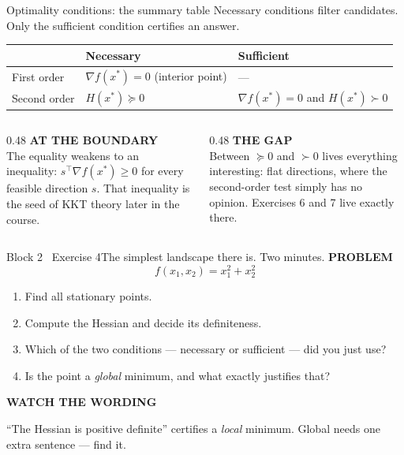 \documentclass[aspectratio=169,11pt]{beamer}
\newcommand{\kicker}[1]{{\color{hseaccent}\scriptsize\bfseries\MakeUppercase{#1}}}
\newcommand{\takeaway}[2]{%
  \par\smallskip\noindent
  \colorbox{hselight}{\parbox{\dimexpr\textwidth-2\fboxsep}{%
    \kicker{#1}\par\vspace{0.12em}\footnotesize #2}}\par}
\begin{document}
\begin{frame}{Optimality conditions: the summary table}
  {Necessary conditions filter candidates. Only the sufficient condition certifies an answer.}
  \vspace{0.5em}
  \centering
  \begin{tabular}{@{}l l l@{}}
    \toprule
                 & \textbf{Necessary}                    & \textbf{Sufficient}                         \\
    \midrule
    First order  & $\nabla f(x^\ast)=0$ (interior point) & ---                                         \\[0.35em]
    Second order & $H(x^\ast)\succeq 0$                  & $\nabla f(x^\ast)=0$ and $H(x^\ast)\succ 0$ \\
    \bottomrule
  \end{tabular}
  \vspace{0.9em}
  \begin{columns}[T,onlytextwidth]
    \begin{column}{0.48\textwidth}
      \kicker{at the boundary}\\[0.25em]
      {\small The equality weakens to an inequality: $s^{\top}\nabla f(x^\ast)\ge 0$ for every feasible
        direction $s$. That inequality is the seed of KKT theory later in the course.}
    \end{column}
    \begin{column}{0.48\textwidth}
      \kicker{the gap}\\[0.25em]
      {\small Between $\succeq 0$ and $\succ 0$ lives everything interesting: flat directions, where the
        second-order test simply has no opinion. Exercises 6 and 7 live exactly there.}
    \end{column}
  \end{columns}
\end{frame}

\begin{frame}{Block 2 \textperiodcentered\ Exercise 4}{The simplest landscape there is. Two minutes.}
  \vspace{0.6em}
  \kicker{problem}
  \[ f(x_1,x_2)=x_1^{2}+x_2^{2} \]
  \vspace{-0.5em}
  \begin{enumerate}\small
    \item Find all stationary points.
    \item Compute the Hessian and decide its definiteness.
    \item Which of the two conditions --- necessary or sufficient --- did you just use?
    \item Is the point a \emph{global} minimum, and what exactly justifies that?
  \end{enumerate}
  \vspace{0.5em}
  \takeaway{watch the wording}{``The Hessian is positive definite'' certifies a \emph{local} minimum.
    Global needs one extra sentence --- find it.}
\end{frame}
\end{document}
